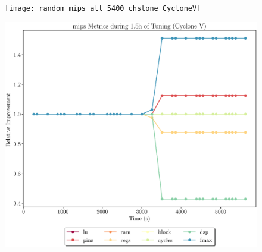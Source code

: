 \documentclass[12pt, a4paper]{article}
\begin{document}
\begin{figure}[htpb]
    \begin{minipage}{.48\textwidth}
        \texttt{[image: random\_mips\_all\_5400\_chstone\_CycloneV]}
    \end{minipage}%
    \hfill
    \begin{minipage}{.48\textwidth}
        \includegraphics[scale=.25]{mips_all_5400_chstone_CycloneV}
    \end{minipage}%
\end{figure}

\newpage
\end{document}
